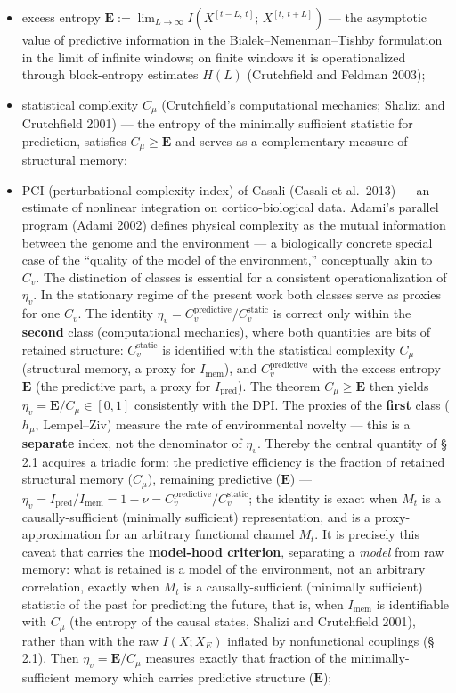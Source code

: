 \documentclass[pdflatex,sn-mathphys-ay]{sn-jnl}
\providecommand{\tightlist}{\setlength{\itemsep}{0pt}\setlength{\parskip}{0pt}}
\begin{document}
\begin{itemize}
\tightlist
\item
  excess entropy \(\mathbf{E} := \lim_{L\to\infty} I(X^{[t-L,\,t]};\, X^{[t,\,t+L]})\) --- the asymptotic value of predictive information in the Bialek--Nemenman--Tishby formulation in the limit of infinite windows; on finite windows it is operationalized through block-entropy estimates \(H(L)\) (Crutchfield and Feldman 2003);
\item
  statistical complexity \(C_\mu\) (Crutchfield's computational mechanics; Shalizi and Crutchfield 2001) --- the entropy of the minimally sufficient statistic for prediction, satisfies \(C_\mu \ge \mathbf{E}\) and serves as a complementary measure of structural memory;
\item
  PCI (perturbational complexity index) of Casali (Casali et al.~2013) --- an estimate of nonlinear integration on cortico-biological data. Adami's parallel program (Adami 2002) defines physical complexity as the mutual information between the genome and the environment --- a biologically concrete special case of the ``quality of the model of the environment,'' conceptually akin to \(C_v\). The distinction of classes is essential for a consistent operationalization of \(\eta_v\). In the stationary regime of the present work both classes serve as proxies for one \(C_v\). The identity \(\eta_v = C_v^{\text{predictive}}/C_v^{\text{static}}\) is correct only within the \textbf{second} class (computational mechanics), where both quantities are bits of retained structure: \(C_v^{\text{static}}\) is identified with the statistical complexity \(C_\mu\) (structural memory, a proxy for \(I_{\text{mem}}\)), and \(C_v^{\text{predictive}}\) with the excess entropy \(\mathbf{E}\) (the predictive part, a proxy for \(I_{\text{pred}}\)). The theorem \(C_\mu \ge \mathbf{E}\) then yields \(\eta_v = \mathbf{E}/C_\mu \in [0, 1]\) consistently with the DPI. The proxies of the \textbf{first} class (\(h_\mu\), Lempel--Ziv) measure the rate of environmental novelty --- this is a \textbf{separate} index, not the denominator of \(\eta_v\). Thereby the central quantity of § 2.1 acquires a triadic form: the predictive efficiency is the fraction of retained structural memory (\(C_\mu\)), remaining predictive (\(\mathbf{E}\)) --- \(\eta_v = I_{\text{pred}}/I_{\text{mem}} = 1 - \nu = C_v^{\text{predictive}}/C_v^{\text{static}}\); the identity is exact when \(M_t\) is a causally-sufficient (minimally sufficient) representation, and is a proxy-approximation for an arbitrary functional channel \(M_t\). It is precisely this caveat that carries the \textbf{model-hood criterion}, separating a \emph{model} from raw memory: what is retained is a model of the environment, not an arbitrary correlation, exactly when \(M_t\) is a causally-sufficient (minimally sufficient) statistic of the past for predicting the future, that is, when \(I_{\text{mem}}\) is identifiable with \(C_\mu\) (the entropy of the causal states, Shalizi and Crutchfield 2001), rather than with the raw \(I(X; X_E)\) inflated by nonfunctional couplings (§ 2.1). Then \(\eta_v = \mathbf{E}/C_\mu\) measures exactly that fraction of the minimally-sufficient memory which carries predictive structure (\(\mathbf{E}\)); 
\end{itemize}
\end{document}

